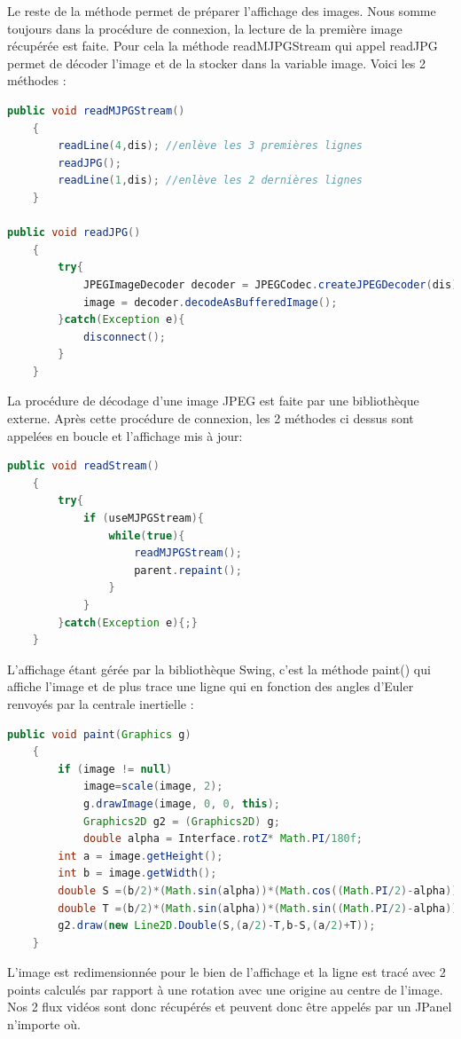 \documentclass[a4paper,11pt]{report}
\begin{document}
		\newline Le reste de la méthode permet de préparer l'affichage des images.
		\newline Nous somme toujours dans la procédure de connexion, la lecture de la première image récupérée est faite. Pour cela la méthode readMJPGStream qui appel readJPG permet de décoder l'image et de la stocker dans la variable image. Voici les 2 méthodes :
		\begin{lstlisting}[language=java]
public void readMJPGStream()
	{
		readLine(4,dis); //enlève les 3 premières lignes
		readJPG();
		readLine(1,dis); //enlève les 2 dernières lignes
	}
	
public void readJPG()
	{
		try{
			JPEGImageDecoder decoder = JPEGCodec.createJPEGDecoder(dis);
			image = decoder.decodeAsBufferedImage();
		}catch(Exception e){
			disconnect();
		}
	}
		\end{lstlisting}
		La procédure de décodage d'une image JPEG est faite par une bibliothèque externe.
		\newpage Après cette procédure de connexion, les 2 méthodes ci dessus sont appelées en boucle et l'affichage mis à jour:
		\begin{lstlisting}[language=java]
public void readStream()
	{
		try{
			if (useMJPGStream){
				while(true){
					readMJPGStream();
					parent.repaint();
				}
			}
    	}catch(Exception e){;}
    }
		\end{lstlisting}
		L'affichage étant gérée par la bibliothèque Swing, c'est la méthode paint() qui affiche l'image et de plus trace une ligne qui en fonction des angles d’Euler renvoyés par la centrale inertielle :
		\begin{lstlisting}[language=java]
public void paint(Graphics g)
	{
		if (image != null)
			image=scale(image, 2);
			g.drawImage(image, 0, 0, this);
			Graphics2D g2 = (Graphics2D) g;
			double alpha = Interface.rotZ* Math.PI/180f;
    	int a = image.getHeight();
    	int b = image.getWidth();
    	double S =(b/2)*(Math.sin(alpha))*(Math.cos((Math.PI/2)-alpha));
    	double T =(b/2)*(Math.sin(alpha))*(Math.sin((Math.PI/2)-alpha));
    	g2.draw(new Line2D.Double(S,(a/2)-T,b-S,(a/2)+T));
	}
		\end{lstlisting}
	L'image est redimensionnée pour le bien de l'affichage et la ligne est tracé avec 2 points calculés par rapport à une rotation avec une origine au centre de l'image.
	\newline \newline Nos 2 flux vidéos sont donc récupérés et peuvent donc être appelés par un JPanel n'importe où.
\newpage
\end{document}
